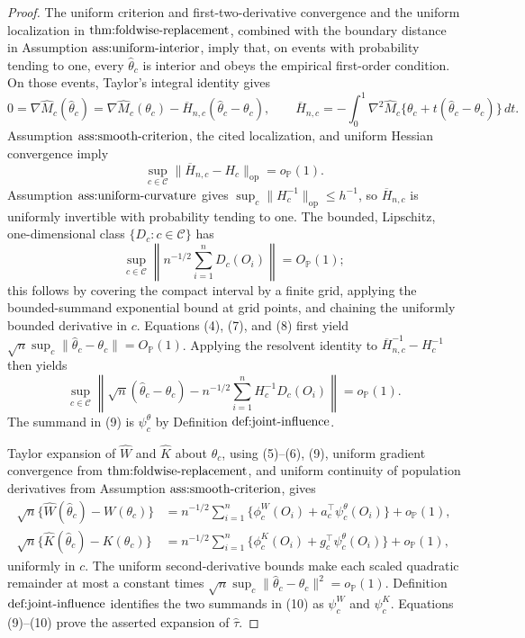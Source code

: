 \documentclass{article}
\begin{document}
\begin{proof}
The uniform criterion and first-two-derivative convergence and the uniform localization in \(\textnormal{thm:foldwise-replacement}\), combined with the boundary distance in Assumption \(\textnormal{ass:uniform-interior}\), imply that, on events with probability tending to one, every \(\widehat\theta_c\) is interior and obeys the empirical first-order condition.  On those events, Taylor's integral identity gives
\[
 0=\nabla\widehat M_c(\widehat\theta_c)
 =\nabla\widehat M_c(\theta_c)
  -\overline H_{n,c}(\widehat\theta_c-\theta_c),
 \qquad
 \overline H_{n,c}=-\int_0^1\nabla^2\widehat M_c
 \{\theta_c+t(\widehat\theta_c-\theta_c)\}\,dt. \tag{7}
\]
Assumption \(\textnormal{ass:smooth-criterion}\), the cited localization, and uniform Hessian convergence imply
\[
 \sup_{c\in\mathcal C}\|\overline H_{n,c}-H_c\|_{\mathrm{op}}
 =o_{\mathbb P}(1).
\]
Assumption \(\textnormal{ass:uniform-curvature}\) gives \(\sup_c\|H_c^{-1}\|_{\mathrm{op}}\le h^{-1}\), so \(\overline H_{n,c}\) is uniformly invertible with probability tending to one.  The bounded, Lipschitz, one-dimensional class \(\{D_c:c\in\mathcal C\}\) has
\[
 \sup_{c\in\mathcal C}\left\|n^{-1/2}\sum_{i=1}^nD_c(O_i)\right\|=O_{\mathbb P}(1); \tag{8}
\]
this follows by covering the compact interval by a finite grid, applying the bounded-summand exponential bound at grid points, and chaining the uniformly bounded derivative in \(c\).  Equations (4), (7), and (8) first yield \(\sqrt n\sup_c\|\widehat\theta_c-\theta_c\|=O_{\mathbb P}(1)\).  Applying the resolvent identity to \(\overline H_{n,c}^{-1}-H_c^{-1}\) then yields
\[
 \sup_{c\in\mathcal C}\left\|
 \sqrt n(\widehat\theta_c-\theta_c)
 -n^{-1/2}\sum_{i=1}^nH_c^{-1}D_c(O_i)
 \right\|=o_{\mathbb P}(1). \tag{9}
\]
The summand in (9) is \(\psi_c^\theta\) by Definition \(\textnormal{def:joint-influence}\).

Taylor expansion of \(\widehat W\) and \(\widehat K\) about \(\theta_c\), using (5)--(6), (9), uniform gradient convergence from \(\textnormal{thm:foldwise-replacement}\), and uniform continuity of population derivatives from Assumption \(\textnormal{ass:smooth-criterion}\), gives
\[
\begin{aligned}
 \sqrt n\{\widehat W(\widehat\theta_c)-W(\theta_c)\}
 &=n^{-1/2}\sum_{i=1}^n
 \{\phi_c^W(O_i)+a_c^\top\psi_c^\theta(O_i)\}+o_{\mathbb P}(1),\\
 \sqrt n\{\widehat K(\widehat\theta_c)-K(\theta_c)\}
 &=n^{-1/2}\sum_{i=1}^n
 \{\phi_c^K(O_i)+g_c^\top\psi_c^\theta(O_i)\}+o_{\mathbb P}(1),
\end{aligned} \tag{10}
\]
uniformly in \(c\).  The uniform second-derivative bounds make each scaled quadratic remainder at most a constant times
\(
 \sqrt n\sup_c\|\widehat\theta_c-\theta_c\|^2=o_{\mathbb P}(1)
\).
Definition \(\textnormal{def:joint-influence}\) identifies the two summands in (10) as \(\psi_c^W\) and \(\psi_c^K\).  Equations (9)--(10) prove the asserted expansion of \(\widehat\tau\).


\end{proof}
\end{document}
